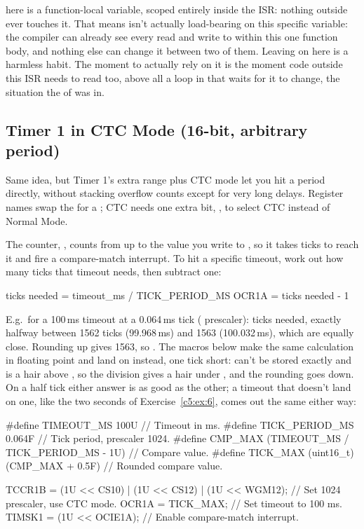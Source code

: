  here is a function-local  variable, scoped entirely inside the ISR:
nothing outside  ever touches it. That means  isn't
actually load-bearing on this specific variable: the compiler can already see every read and write
to  within this one function body, and nothing else can change it between two of
them. Leaving  on here is a harmless habit. The moment to actually rely on it is the
moment code outside this ISR needs to read  too, above all a loop in 
that waits for it to change, the situation the  of  was in.

\subsection{Timer 1 in CTC Mode (16-bit, arbitrary period)}
\label{c5:a:5}
Same idea, but Timer 1's extra range plus CTC mode let you hit a period directly, without stacking
overflow counts except for very long delays. Register names swap the  for a ; CTC
needs one extra bit, , to select CTC instead of Normal Mode.

The counter, , counts from  up to the value you write to , so it
takes  ticks to reach it and fire a compare-match interrupt. To hit a specific
timeout, work out how many ticks that timeout needs, then subtract one:

\begin{console}
ticks needed = timeout_ms / TICK_PERIOD_MS
OCR1A        = ticks needed - 1
\end{console}

\noindent E.g.\ for a 100\,ms timeout at a 0.064\,ms tick ( prescaler):
 ticks needed, exactly halfway between 1562 ticks (99.968\,ms) and 1563
(100.032\,ms), which are equally close. Rounding up gives 1563, so .
The macros below make the same calculation in floating point and land on  instead, one
tick short:  can't be stored exactly and is a hair above , so the
division gives a hair under , and the rounding goes down. On a half tick either answer
is as good as the other; a timeout that doesn't land on one, like the two seconds of
Exercise~\ref{c5:ex:6}, comes out the same either way:

\begin{ccode}
#define TIMEOUT_MS 100U                            // Timeout in ms.
#define TICK_PERIOD_MS 0.064F                      // Tick period, prescaler 1024.
#define CMP_MAX (TIMEOUT_MS / TICK_PERIOD_MS - 1U) // Compare value.
#define TICK_MAX (uint16_t)(CMP_MAX + 0.5F)        // Rounded compare value.

TCCR1B = (1U << CS10) | (1U << CS12) | (1U << WGM12); // Set 1024 prescaler, use CTC mode.
OCR1A  = TICK_MAX;                                    // Set timeout to 100 ms.
TIMSK1 = (1U << OCIE1A);                              // Enable compare-match interrupt.
\end{ccode}

